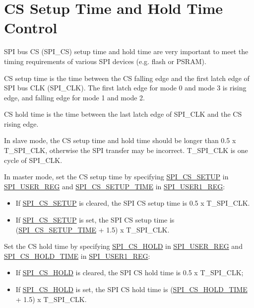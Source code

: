 \documentclass[main\_\_EN.tex]{subfiles}
\begin{document}
\section{CS Setup Time and Hold Time Control}\label{sec:gp-spi2-cs-timing}

SPI bus CS (SPI\_CS) setup time and hold time are very important to meet the timing requirements of various SPI devices (e.g. flash or PSRAM).

CS setup time is the time between the CS falling edge and the first latch edge of SPI bus CLK (SPI\_CLK). The first latch edge for mode 0 and mode 3 is rising edge, and falling edge for mode 1 and mode 2.

CS hold time is the time between the last latch edge of SPI\_CLK and the CS rising edge.

In slave mode, the CS setup time and hold time should be longer than 0.5 x T\_SPI\_CLK, otherwise the SPI transfer may be incorrect. T\_SPI\_CLK is one cycle of SPI\_CLK.

In master mode, set the CS setup time by specifying \hyperref[fielddesc:SPICSSETUP]{SPI\_CS\_SETUP} in \hyperref[regdesc:SPIUSERREG]{SPI\_USER\_REG} and  \hyperref[fielddesc:SPICSSETUPTIME]{SPI\_CS\_SETUP\_TIME} in \hyperref[regdesc:SPIUSER1REG]{SPI\_USER1\_REG}:
    \begin{itemize}
        \item If \hyperref[fielddesc:SPICSSETUP]{SPI\_CS\_SETUP} is cleared, the SPI CS setup time is 0.5 x T\_SPI\_CLK.
        \item If \hyperref[fielddesc:SPICSSETUP]{SPI\_CS\_SETUP} is set, the SPI CS setup time is (\hyperref[fielddesc:SPICSSETUPTIME]{SPI\_CS\_SETUP\_TIME} + 1.5) x T\_SPI\_CLK.
    \end{itemize}

Set the CS hold time by specifying \hyperref[fielddesc:SPICSHOLD]{SPI\_CS\_HOLD} in \hyperref[regdesc:SPIUSERREG]{SPI\_USER\_REG} and  \hyperref[fielddesc:SPICSHOLDTIME]{SPI\_CS\_HOLD\_TIME} in \hyperref[regdesc:SPIUSER1REG]{SPI\_USER1\_REG}:
    \begin{itemize}
        \item If \hyperref[fielddesc:SPICSHOLD]{SPI\_CS\_HOLD} is cleared, the SPI CS hold time is 0.5 x T\_SPI\_CLK;
        \item If \hyperref[fielddesc:SPICSHOLD]{SPI\_CS\_HOLD} is set, the SPI CS hold time is (\hyperref[fielddesc:SPICSHOLDTIME]{SPI\_CS\_HOLD\_TIME} + 1.5) x T\_SPI\_CLK.
    \end{itemize}
\end{document}
